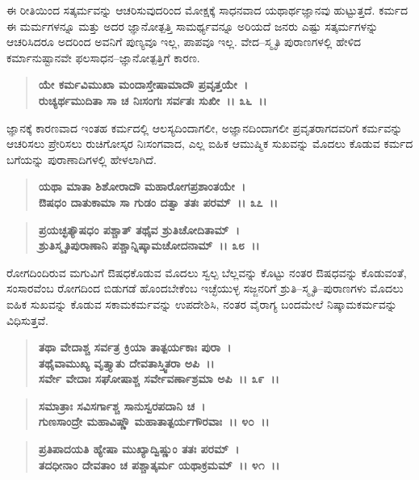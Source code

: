 ಈ ರೀತಿಯಿಂದ ಸತ್ಕರ್ಮವನ್ನು ಆಚರಿಸುವುದರಿಂದ ಮೋಕ್ಷಕ್ಕೆ ಸಾಧನವಾದ ಯಥಾರ್ಥ\-ಜ್ಞಾನವು ಹುಟ್ಟುತ್ತದೆ. ಕರ್ಮದ ಈ ಮರ್ಮಗಳನ್ನೂ ಮತ್ತು ಅದರ ಜ್ಞಾನೋತ್ಪತ್ತಿ ಸಾಮರ್ಥ್ಯವನ್ನೂ ಅರಿಯದೆ ಜನರು ಎಷ್ಟು ಸತ್ಕರ್ಮಗಳನ್ನು ಆಚರಿಸಿದರೂ ಅದರಿಂದ ಅವನಿಗೆ ಪುಣ್ಯವೂ ಇಲ್ಲ, ಪಾಪವೂ ಇಲ್ಲ. ವೇದ–ಸ್ಮೃತಿ ಪುರಾಣಗಳಲ್ಲಿ ಹೇಳಿದ ಕರ್ಮಾನುಷ್ಟಾನವೇ ಫಲ\-ಸಾಧನ–ಜ್ಞಾನೋತ್ಪತ್ತಿಗೆ ಕಾರಣ.

\begin{verse}
\textbf{ಯೇ ಕರ್ಮವಿಮುಖಾ ಮಂದಾಸ್ತೇಷಾಮಾದೌ ಪ್ರವೃತ್ತಯೇ~।}\\\textbf{ರುಚ್ಯರ್ಥಮುದಿತಾ ಸಾ ಚ ನಿಃಸಂಗಃ ಸರ್ವತಃ ಸುಖೀ~।। ೩೬~।।}
\end{verse}

ಜ್ಞಾನಕ್ಕೆ ಕಾರಣವಾದ ಇಂತಹ ಕರ್ಮದಲ್ಲಿ ಆಲಸ್ಯದಿಂದಾಗಲೀ, ಅಜ್ಞಾನದಿಂದಾಗಲೀ ಪ್ರವೃತರಾಗದವರಿಗೆ ಕರ್ಮವನ್ನು ಆಚರಿಸಲು ಪ್ರೇರಿಸಲು ರುಚಿಗೋಸ್ಕರ ನಿಃಸಂಗವಾದ, ಎಲ್ಲ ಐಹಿಕ ಆಮುಷ್ಮಿಕ ಸುಖವನ್ನು ಮೊದಲು ಕೊಡುವ ಕರ್ಮದ ಬಗೆಯನ್ನು ಪುರಾಣಾದಿಗಳಲ್ಲಿ ಹೇಳಲಾಗಿದೆ.

\begin{verse}
\textbf{ಯಥಾ ಮಾತಾ ಶಿಶೋರಾದೌ ಮಹಾರೋಗಪ್ರಶಾಂತಯೇ~।}\\\textbf{ಔಷಧಂ ದಾತುಕಾಮಾ ಸಾ ಗುಡಂ ದತ್ವಾ ತತಃ ಪರಮ್~।। ೩೭~।। } 
\end{verse}

\begin{verse}
\textbf{ಪ್ರಯಚ್ಛತ್ಯೌಷಧಂ ಪಶ್ಚಾತ್ ತಥೈವ ಶ್ರುತಿಚೋದಿತಾಮ್~।}\\\textbf{ಶ್ರುತಿಸ್ಮೃತಿಪುರಾಣಾನಿ ಪಶ್ಚಾನ್ನಿಷ್ಕಾಮಚೋದನಾಮ್~।। ೩೮~।।}
\end{verse}

ರೋಗದಿಂದಿರುವ ಮಗುವಿಗೆ ಔಷಧಕೊಡುವ ಮೊದಲು ಸ್ವಲ್ಪ ಬೆಲ್ಲವನ್ನು ಕೊಟ್ಟು ನಂತರ ಔಷಧವನ್ನು ಕೊಡುವಂತೆ, ಸಂಸಾರವೆಂಬ ರೋಗದಿಂದ ಬಿಡುಗಡೆ ಹೊಂದಬೇಕೆಂಬ ಇಚ್ಛೆಯುಳ್ಳ ಸಜ್ಜನರಿಗೆ ಶ್ರುತಿ–ಸ್ಮೃತಿ–ಪುರಾಣಗಳು ಮೊದಲು ಐಹಿಕ ಸುಖವನ್ನು ಕೊಡುವ ಸಕಾಮಕರ್ಮವನ್ನು ಉಪದೇಶಿಸಿ, ನಂತರ ವೈರಾಗ್ಯ ಬಂದಮೇಲೆ ನಿಷ್ಕಾಮಕರ್ಮವನ್ನು ವಿಧಿಸುತ್ತವೆ.

\begin{verse}
\textbf{ತಥಾ ವೇದಾಶ್ಚ ಸರ್ವತ್ರ ಕ್ರಿಯಾ ತಾತ್ಪರ್ಯಕಾಃ ಪುರಾ~।}\\\textbf{ತಥೈವಾಮುಖ್ಯ ವೃತ್ತ್ಯಾತು ದೇವತಾಸ್ತ್ವಿತರಾ ಅಪಿ~।। }\\\textbf{ಸರ್ವೇ ವೇದಾಃ ಸಘೋಷಾಶ್ಚ ಸರ್ವೇವರ್ಣಾಶ್ರಮಾ ಅಪಿ~।। ೩೯~।। }
\end{verse}

\begin{verse}
\textbf{ಸಮಾತ್ರಾಃ ಸವಿಸರ್ಗಾಶ್ಚ ಸಾನುಸ್ವರಪದಾನಿ ಚ~।}\\\textbf{ಗುಣಸಾಂದ್ರೇ ಮಹಾವಿಷ್ಣೌ ಮಹಾತಾತ್ಪರ್ಯಗೌರವಾಃ~।। ೪೦~।।} 
\end{verse}

\begin{verse}
\textbf{ಪ್ರತಿಪಾದಯತಿ ಹ್ಯೇಷಾ ಮುಖ್ಯಾದ್ವಿಷ್ಣುಂ ತತಃ ಪರಮ್~।}\\\textbf{ತದಧೀನಾಂ ದೇವತಾಂ ಚ ಪಶ್ಚಾತ್ಕರ್ಮ ಯಥಾಕ್ರಮಮ್~।। ೪೧~।।}
\end{verse}

